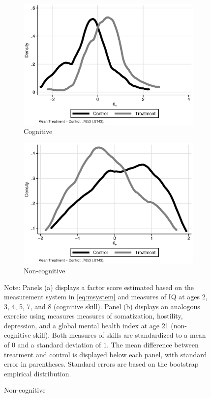 \begin{figure}[H]
\centering
\caption{Estimates of Cognitive and Non-cognitive Skills}\label{figure:factors}
\begin{subfigure}[h]{0.7\textwidth}
		\centering
		\caption{Cognitive} \label{fig:c}
		\includegraphics[width=\textwidth]{output/abccare_cfactor.eps}
\end{subfigure}

\begin{subfigure}[h]{0.7\textwidth}
	\centering
	\caption{Non-cognitive} \label{fig:n}
		\includegraphics[width=\textwidth]{output/abccare_nfactor.eps}
\end{subfigure}
\footnotesize \justify
Note: Panels (a) displays a factor score estimated based on the measurement system in \eqref{eq:msystem} and measures of IQ at ages 2, 3, 4, 5, 7, and 8 (cognitive skill). Panel (b) displays an analogous exercise using measures measures of somatization, hostility, depression, and a global mental health index at age 21 (non-cognitive skill). Both measures of skills are standardized to a mean of $0$ and a standard deviation of $1$. The mean difference between treatment and control is displayed below each panel, with standard error in parentheses. Standard errors are based on the bootstrap empirical distribution.
\end{figure}

